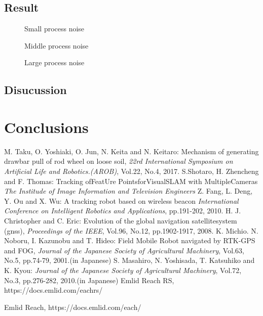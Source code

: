 \documentclass[a4paper]{article}
\begin{document}
\subsection{Result}
%
%
%
\begin{figure}
\centerline{}
\caption{Small process noise}
\centerline{}
\caption{Middle process noise}
\centerline{}
\caption{Large process noise}
\end{figure}
\subsection{Disucussion}
%
%
%
%
%

\section{Conclusions}
%
%
%
%
%
%

\begin{thebibliography}{99}
M. Taku, O. Yoshiaki, O. Jun, N. Keita and N. Keitaro:
Mechanism of generating drawbar pull of rod wheel on loose soil,
{\it 22rd International Symposium on Artificial Life and Robotics.(AROB)}, Vol.22, No.4, 2017.
S.Shotaro, H. Zhencheng and F. Thomas:
Tracking ofFeatUre PointsforVisualSLAM with MultipleCameras
{\it The Institude of Image Information and Television Engineers}
Z. Fang, L. Deng, Y. Ou and X. Wu:
A tracking robot based on wireless beacon
{\it International Conference on Intelligent Robotics and Applications}, pp.191-202, 2010.
H. J. Christopher and C. Eric:
Evolution of the global navigation satellitesystem (gnss),
{\it Proceedings of the IEEE}, Vol.96, No.12, pp.1902-1917, 2008.
K. Michio. N. Noboru, I. Kazunobu and T. Hideo: 
Field Mobile Robot navigated by RTK-GPS and FOG, 
{\it Journal of the Japanese Society of Agricultural Machinery}, Vol.63, No.5, pp.74-79, 2001.(in Japanese)
S. Masahiro, N. Yoshisada, T. Katsuhiko and K. Kyou: 
{\it Journal of the Japanese Society of Agricultural Machinery}, Vol.72, No.3, pp.276-282, 2010.(in Japanese)
Emlid Reach RS, https://docs.emlid.com/eachrs/

Emlid Reach, https://docs.emlid.com/each/
\end{thebibliography}
\end{document}
